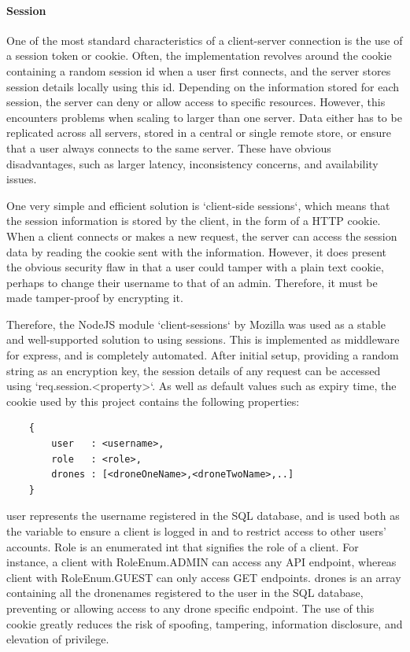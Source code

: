 \documentclass{article}
\begin{document}
\paragraph{Session}\label{session}
One of the most standard characteristics of a client-server connection is the use of a session token or cookie. Often, the implementation revolves around the cookie containing a random session id when a user first connects, and the server stores session details locally using this id.  Depending on the information stored for each session, the server can deny or allow access to specific resources. However, this encounters problems when scaling to larger than one server. Data either has to be replicated across all servers, stored in a central or single remote store, or ensure that a user always connects to the same server\cite{mozillaClientSessions}. These have obvious disadvantages, such as larger latency, inconsistency concerns, and availability issues. 

One very simple and efficient solution is `client-side sessions`, which means that the session information is stored by the client, in the form of a HTTP cookie. When a client connects or makes a new request, the server can access the session data by reading the cookie sent with the information. However, it does present the obvious security flaw in that a user could tamper with a plain text cookie, perhaps to change their username to that of an admin. Therefore, it must be made tamper-proof by encrypting it\cite{mozillaClientSessions}. 

Therefore, the NodeJS module `client-sessions` by Mozilla was used as a stable and well-supported solution to using sessions\cite{client-sessions}. This is implemented as middleware for express, and is completely automated. After initial setup, providing a random string as an encryption key, the session details of any request can be accessed using `req.session.\textless property\textgreater`. As well as default values such as expiry time, the cookie used by this project contains the following properties:
\begin{center}
\begin{lstlisting}
	{
		user   : <username>,
		role   : <role>,
		drones : [<droneOneName>,<droneTwoName>,..]
	}
\end{lstlisting}
\end{center}
user represents the username registered in the SQL database, and is used both as the variable to ensure a client is logged in and to restrict access to other users' accounts. Role is an enumerated int that signifies the role of a client. For instance, a client with RoleEnum.ADMIN can access any API endpoint, whereas client with RoleEnum.GUEST can only access GET endpoints. drones is an array containing all the dronenames registered to the user in the SQL database, preventing or allowing access to any drone specific endpoint. The use of this cookie greatly reduces the risk of spoofing, tampering, information disclosure, and elevation of privilege. 
\end{document}
